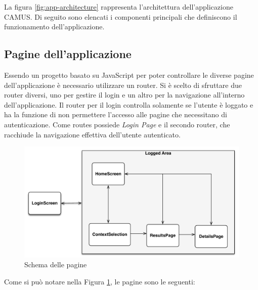 La figura \ref{fig:app-architecture} rappresenta l'architettura dell'applicazione CAMUS. Di seguito sono elencati i componenti principali che definiscono il funzionamento dell'applicazione. 

\subsection{Pagine dell'applicazione}
Essendo un progetto basato su JavaScript per poter controllare le diverse pagine dell'applicazione è necessario utilizzare un router. Si è scelto di sfruttare due router diversi, uno per gestire il login e un altro per la navigazione all'interno dell'applicazione. Il router per il login controlla solamente se l'utente è loggato e ha la funzione di non permettere l'accesso alle pagine che necessitano di autenticazione. Come routes possiede \emph{Login Page} e il secondo router, che racchiude la navigazione effettiva dell'utente autenticato.
\begin{figure}[ht]
	\centering
	\includegraphics[width=\textwidth]{6-implementazione-app/immagini/screen-schema.pdf}
	\caption{Schema delle pagine}\label{fig:screen-schema}
\end{figure}
Come si può notare nella Figura \ref{fig:screen-schema}, le pagine sono le seguenti:
